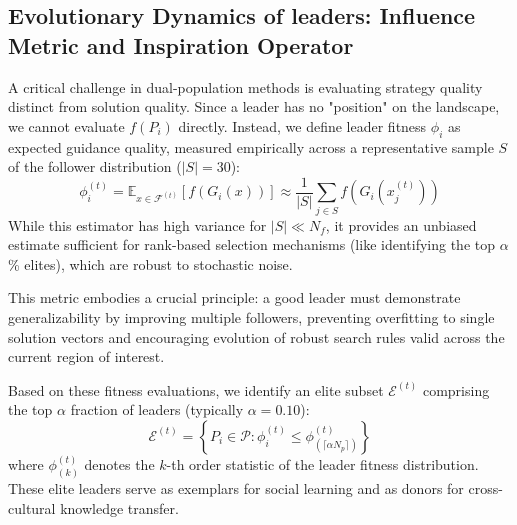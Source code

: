 \documentclass[11pt]{article}
\begin{document}
\subsection{Evolutionary Dynamics of leaders: Influence Metric and Inspiration Operator}


A critical challenge in dual-population methods is evaluating strategy quality distinct from solution quality. Since a leader has no "position" on the landscape, we cannot evaluate $f(P_i)$ directly. Instead, we define leader fitness $\phi_i$ as expected guidance quality, measured empirically across a representative sample $S$ of the follower distribution ($|S|=30$):
\begin{equation}
\phi_i^{(t)} = \mathbb{E}_{x \in \mathcal{F}^{(t)}}[f(G_i(x))] \approx \frac{1}{|S|} \sum_{j \in S} f(G_i(x_j^{(t)}))
\label{eq:leader_fitness}
\end{equation}
\noindent While this estimator has high variance for $|S| \ll N_f$, it provides an unbiased estimate sufficient for rank-based selection mechanisms (like identifying the top $\alpha$\% elites), which are robust to stochastic noise.

This metric embodies a crucial principle: a good leader must demonstrate generalizability by improving multiple followers, preventing overfitting to single solution vectors and encouraging evolution of robust search rules valid across the current region of interest.

Based on these fitness evaluations, we identify an elite subset $\mathcal{E}^{(t)}$ comprising the top $\alpha$ fraction of leaders (typically $\alpha = 0.10$):
\begin{equation}
\mathcal{E}^{(t)} = \left\{ P_i \in \mathcal{P} : \phi_i^{(t)} \leq \phi_{(\lceil \alpha N_p \rceil)}^{(t)} \right\}
\label{eq:elite_set}
\end{equation}
where $\phi_{(k)}^{(t)}$ denotes the $k$-th order statistic of the leader fitness distribution. These elite leaders serve as exemplars for social learning and as donors for cross-cultural knowledge transfer.
\end{document}
